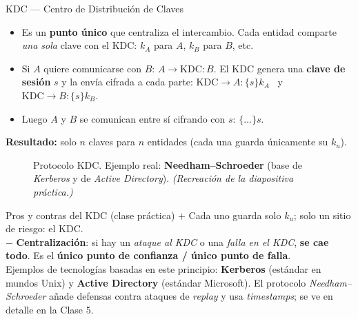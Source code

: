 \documentclass[11pt,a4paper]{article}
\begin{document}
\begin{defbox}{KDC — Centro de Distribución de Claves}
\begin{itemize}[leftmargin=1.4em,itemsep=2pt]
  \item Es un \textbf{punto único} que centraliza el intercambio. Cada entidad comparte
        \emph{una sola} clave con el KDC: $k_A$ para $A$, $k_B$ para $B$, etc.
  \item Si $A$ quiere comunicarse con $B$: $A \to \text{KDC}: B$. El KDC genera una
        \textbf{clave de sesión} $s$ y la envía cifrada a cada parte:
        $\text{KDC}\to A:\{s\}k_A$ \ y \ $\text{KDC}\to B:\{s\}k_B$.
  \item Luego $A$ y $B$ se comunican entre sí cifrando con $s$: $\{\dots\}s$.
\end{itemize}
\textbf{Resultado:} solo $n$ claves para $n$ entidades (cada una guarda únicamente su $k_u$).
\end{defbox}

\begin{figure}[h]
\centering
{}
\caption{Protocolo KDC. Ejemplo real: \textbf{Needham--Schroeder} (base de \emph{Kerberos} y de
\emph{Active Directory}). \textit{(Recreación de la diapositiva práctica.)}}
\end{figure}

\begin{practbox}{Pros y contras del KDC (clase práctica)}
\textbf{\large\color{practGreen}$\boldsymbol{+}$}\quad
Cada uno guarda solo $k_u$; solo un sitio de riesgo: el KDC.\\[3pt]
\textbf{\large\color{attackRed}$\boldsymbol{-}$}\quad
\textbf{Centralización}: si hay un \emph{ataque al KDC} o una \emph{falla en el KDC},
\textbf{se cae todo}. Es el \textbf{único punto de confianza / único punto de falla}.\\[4pt]
Ejemplos de tecnologías basadas en este principio: \textbf{Kerberos} (estándar en mundos
Unix) y \textbf{Active Directory} (estándar Microsoft). El protocolo \emph{Needham--Schroeder}
añade defensas contra ataques de \emph{replay} y usa \emph{timestamps}; se ve en detalle en la
Clase 5.
\end{practbox}
\end{document}

